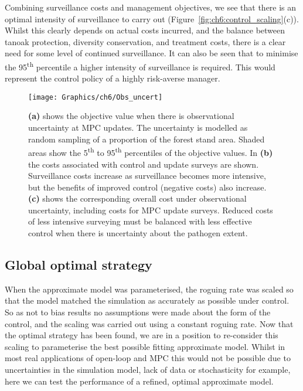 Combining surveillance costs and management objectives, we see that there is an optimal intensity of surveillance to carry out (Figure~\ref{fig:ch6:control_scaling}(c)). Whilst this clearly depends on actual costs incurred, and the balance between tanoak protection, diversity conservation, and treatment costs, there is a clear need for some level of continued surveillance. It can also be seen that to minimise the 95\textsuperscript{th} percentile a higher intensity of surveillance is required. This would represent the control policy of a highly risk-averse manager.

\begin{figure}[t]
    \begin{center}
        \texttt{[image: Graphics/ch6/Obs\_uncert]}
        \caption[Performance of MPC under observational uncertainty]{\textbf{(a)} shows the objective value when there is observational uncertainty at MPC updates. The uncertainty is modelled as random sampling of a proportion of the forest stand area. Shaded areas show the 5\textsuperscript{th} to 95\textsuperscript{th} percentiles of the objective values. In \textbf{(b)} the costs associated with control and update surveys are shown. Surveillance costs increase as surveillance becomes more intensive, but the benefits of improved control (negative costs) also increase. \textbf{(c)} shows the corresponding overall cost under observational uncertainty, including costs for MPC update surveys. Reduced costs of less intensive surveying must be balanced with less effective control when there is uncertainty about the pathogen extent.\label{fig:ch6:obs_uncert}}
    \end{center}
\end{figure}

\FloatBarrier
\subsection{Global optimal strategy}

When the approximate model was parameterised, the roguing rate was scaled so that the model matched the simulation as accurately as possible under control. So as not to bias results no assumptions were made about the form of the control, and the scaling was carried out using a constant roguing rate. Now that the optimal strategy has been found, we are in a position to re-consider this scaling to parameterise the best possible fitting approximate model. Whilst in most real applications of open-loop and MPC this would not be possible due to uncertainties in the simulation model, lack of data or stochasticity for example, here we can test the performance of a refined, optimal approximate model.

